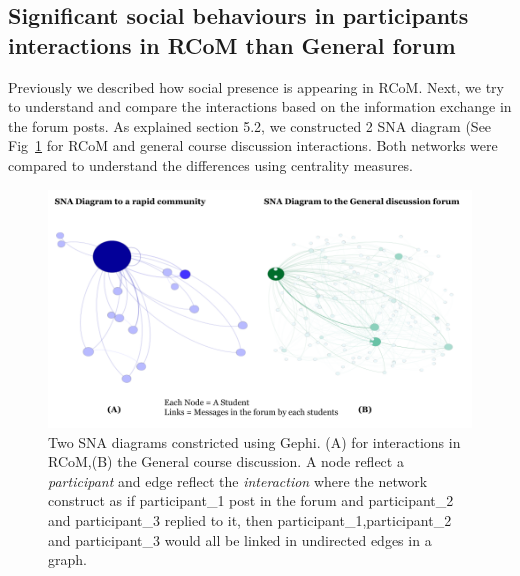 \documentclass[format=acmsmall, review=false, screen=true]{acmart}
\begin{document}
\subsection{Significant social behaviours in participants interactions in RCoM than General forum}

Previously we described how social presence is appearing in RCoM. Next, we try to understand and compare the interactions based on the information exchange in the forum posts. As explained section 5.2, we constructed 2 SNA diagram (See Fig~\ref{fig:SNA} for RCoM and general course discussion interactions. Both networks were compared to understand the differences using centrality measures. 

\begin{figure}[h]
 \centering
 \includegraphics[width=0.8\linewidth]{images/SNADiagrams.png}
 \caption{Two SNA diagrams constricted using Gephi. (A) for interactions in RCoM,(B) the General course discussion. A node reflect a \textit{participant} and edge reflect the \textit{interaction} where the network construct as if participant\_1 post in the forum and participant\_2 and participant\_3 replied to it, then participant\_1,participant\_2 and participant\_3 would all be linked in undirected edges in a graph.}
 \label{fig:SNA}
\end{figure}
\end{document}

